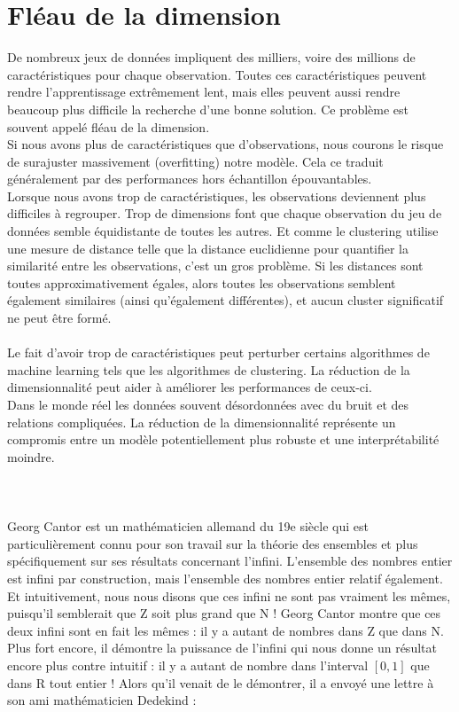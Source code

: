 \section{Fléau de la dimension}
De nombreux jeux de données impliquent des milliers, voire des millions de caractéristiques pour chaque observation. Toutes ces caractéristiques peuvent rendre l'apprentissage extrêmement lent, mais elles peuvent aussi rendre beaucoup plus difficile la recherche d'une bonne solution. Ce problème est souvent appelé fléau de la dimension.
\\
Si nous avons plus de caractéristiques que d'observations, nous courons le risque de surajuster massivement (overfitting) notre modèle. Cela ce traduit généralement par des performances hors échantillon épouvantables.
\\
Lorsque nous avons trop de caractéristiques, les observations deviennent plus difficiles à regrouper. Trop de dimensions font que chaque observation du jeu de données semble équidistante de toutes les autres. Et comme le clustering utilise une mesure de distance telle que la distance euclidienne pour quantifier la similarité entre les observations, c'est un gros problème. Si les distances sont toutes approximativement égales, alors toutes les observations semblent également similaires (ainsi qu'également différentes), et aucun cluster significatif ne peut être formé.
\\
\\
Le fait d'avoir trop de caractéristiques peut perturber certains algorithmes de machine learning tels que les algorithmes de clustering. La réduction de la dimensionnalité peut aider à améliorer les performances de ceux-ci.
\\
Dans le monde réel les données souvent désordonnées avec du bruit et des relations compliquées. La réduction de la dimensionnalité représente un compromis entre un modèle potentiellement plus robuste et une interprétabilité moindre.
\\
\\
\\
\\
Georg Cantor est un mathématicien allemand du 19e siècle qui est particulièrement connu pour son travail sur la théorie des ensembles et plus spécifiquement sur ses résultats concernant l’infini. L’ensemble des nombres entier est infini par construction, mais l’ensemble des nombres entier relatif également. Et intuitivement, nous nous disons que ces infini ne sont pas vraiment les mêmes, puisqu’il semblerait que Z soit plus grand que N ! Georg Cantor montre que ces deux infini sont en fait les mêmes : il y a autant de nombres dans Z que dans N. Plus fort encore, il démontre la puissance de l’infini qui nous donne un résultat encore plus contre intuitif : il y a autant de nombre dans l’interval $[0, 1]$ que dans R tout entier ! Alors qu’il venait de le démontrer, il a envoyé une lettre à son ami mathématicien Dedekind :
